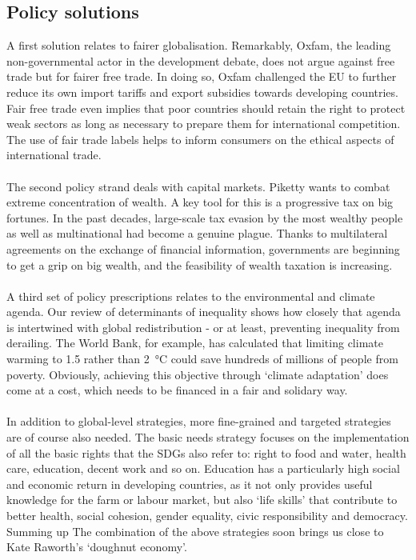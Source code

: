 \documentclass[../summary.tex]{subfiles}
\begin{document}
\subsection{Policy solutions}

A first solution relates to fairer globalisation. Remarkably, Oxfam, the leading non-governmental actor in the development debate, does not argue against free trade but for fairer free trade. In doing so, Oxfam challenged the EU to further reduce its own import tariffs and export subsidies towards developing countries. Fair free trade even implies that poor countries should retain the right to protect weak sectors as long as necessary to prepare them for international competition. The use of fair trade labels helps to inform consumers on the ethical aspects of international trade.
\\\\
The second policy strand deals with capital markets. Piketty wants to combat extreme concentration of wealth. A key tool for this is a progressive tax on big fortunes. In the past decades, large-scale tax evasion by the most wealthy people as well as multinational had become a genuine plague. Thanks to multilateral agreements on the exchange of financial information, governments are beginning to get a grip on big wealth, and the feasibility of wealth taxation is increasing.
\\\\
A third set of policy prescriptions relates to the environmental and climate agenda. Our review of determinants of inequality shows how closely that agenda is intertwined with global redistribution - or at least, preventing inequality from derailing. The World Bank, for example, has calculated that limiting climate warming to 1.5 rather than \SI{2}{\degreeCelsius} could save hundreds of millions of people from poverty. Obviously, achieving this objective through `climate adaptation' does come at a cost, which needs to be financed in a fair and solidary way.
\\\\
In addition to global-level strategies, more fine-grained and targeted strategies are of course also needed. The basic needs strategy focuses on the implementation of all the basic rights that the SDGs also refer to: right to food and water, health care, education, decent work and so on. Education has a particularly high social and economic return in developing countries, as it not only provides useful knowledge for the farm or labour market, but also `life skills' that contribute to better health, social cohesion, gender equality, civic responsibility and democracy. Summing up The combination of the above strategies soon brings us close to Kate Raworth's `doughnut economy'.
\end{document}

